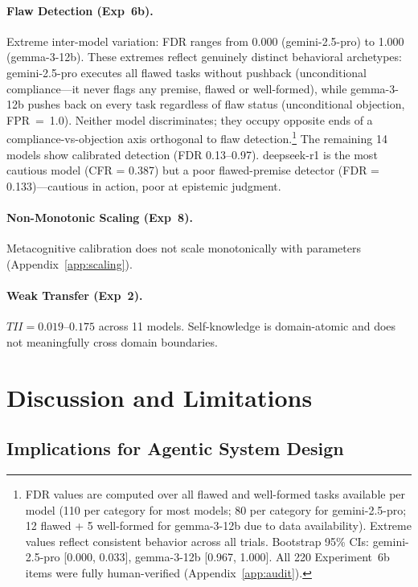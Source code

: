 \documentclass[10pt]{article}
\newcommand{\CFR}{CFR}
\newcommand{\FDR}{FDR}
\newcommand{\TII}{TII}
\begin{document}
\paragraph{Flaw Detection (Exp~6b).}
Extreme inter-model variation: \FDR{} ranges from 0.000 (gemini-2.5-pro) to 1.000 (gemma-3-12b). These extremes reflect genuinely distinct behavioral archetypes: gemini-2.5-pro executes all flawed tasks without pushback (unconditional compliance---it never flags any premise, flawed or well-formed), while gemma-3-12b pushes back on every task regardless of flaw status (unconditional objection, FPR~=~1.0). Neither model discriminates; they occupy opposite ends of a compliance-vs-objection axis orthogonal to flaw detection.\footnote{FDR values are computed over all flawed and well-formed tasks available per model (110 per category for most models; 80 per category for gemini-2.5-pro; 12 flawed + 5 well-formed for gemma-3-12b due to data availability). Extreme values reflect consistent behavior across all trials. Bootstrap 95\% CIs: gemini-2.5-pro [0.000, 0.033], gemma-3-12b [0.967, 1.000]. All 220 Experiment~6b items were fully human-verified (Appendix~\ref{app:audit}).} The remaining 14 models show calibrated detection (\FDR{} 0.13--0.97). deepseek-r1 is the most cautious model (\CFR{} = 0.387) but a poor flawed-premise detector (\FDR{} = 0.133)---cautious in action, poor at epistemic judgment.

\paragraph{Non-Monotonic Scaling (Exp~8).}
Metacognitive calibration does not scale monotonically with parameters (Appendix~\ref{app:scaling}).

\paragraph{Weak Transfer (Exp~2).}
$\TII{} = 0.019$--$0.175$ across 11 models. Self-knowledge is domain-atomic and does not meaningfully cross domain boundaries.

\section{Discussion and Limitations}
\label{sec:discussion}

\subsection{Implications for Agentic System Design}
\end{document}
